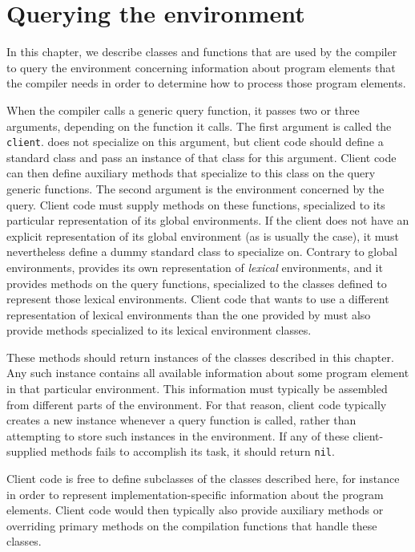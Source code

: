 \chapter{Querying the environment}

\label{chap-environment-querying}

In this chapter, we describe classes and functions that are used by
the compiler to query the environment concerning information about
program elements that the compiler needs in order to determine how to
process those program elements.

When the compiler calls a generic query function, it passes two or
three arguments, depending on the function it calls.  The first
argument is called the \texttt{client}.  \sysname{} does not
specialize on this argument, but client code should define a standard
class and pass an instance of that class for this argument.  Client
code can then define auxiliary methods that specialize to this class
on the query generic functions.  The second argument is the
environment concerned by the query.  Client code must supply methods
on these functions, specialized to its particular representation of
its global environments.  If the client does not have an explicit
representation of its global environment (as is usually the case), it
must nevertheless define a dummy standard class to specialize on.
Contrary to global environments, \sysname{} provides its own
representation of \emph{lexical} environments, and it provides methods
on the query functions, specialized to the classes defined to
represent those lexical environments.  Client code that wants
to use a different representation of lexical environments than the one
provided by \sysname{} must also provide methods specialized to its
lexical environment classes.

These methods should return instances of the classes described in this
chapter.  Any such instance contains all available information about
some program element in that particular environment.  This information
must typically be assembled from different parts of the environment.
For that reason, client code typically creates a new instance whenever
a query function is called, rather than attempting to store such
instances in the environment.  If any of these client-supplied methods
fails to accomplish its task, it should return \texttt{nil}.

Client code is free to define subclasses of the classes described
here, for instance in order to represent implementation-specific
information about the program elements.  Client code would then
typically also provide auxiliary methods or overriding primary methods
on the compilation functions that handle these classes.

